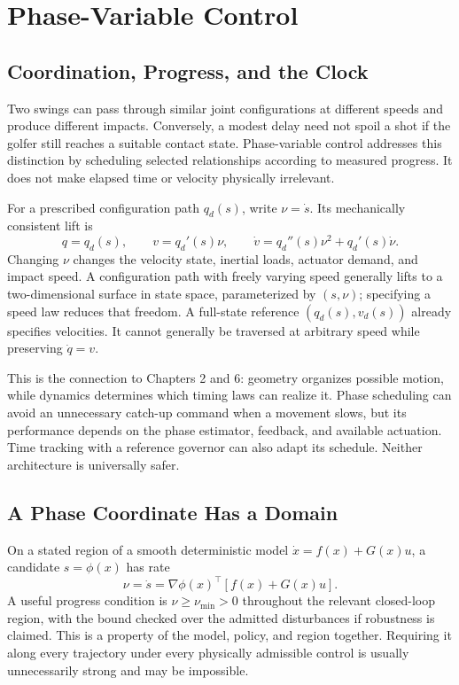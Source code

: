 \chapter{Phase-Variable Control}
\label{ch:phase_variable_control}

\section{Coordination, Progress, and the Clock}

Two swings can pass through similar joint configurations at different speeds and produce different impacts. Conversely, a modest delay need not spoil a shot if the golfer still reaches a suitable contact state. Phase-variable control addresses this distinction by scheduling selected relationships according to measured progress. It does not make elapsed time or velocity physically irrelevant.

For a prescribed configuration path $q_d(s)$, write $\nu=\dot s$. Its mechanically consistent lift is
\begin{equation}
q=q_d(s),\qquad v=q_d'(s)\nu,\qquad
\dot v=q_d''(s)\nu^2+q_d'(s)\dot\nu .
\end{equation}
Changing $\nu$ changes the velocity state, inertial loads, actuator demand, and impact speed. A configuration path with freely varying speed generally lifts to a two-dimensional surface in state space, parameterized by $(s,\nu)$; specifying a speed law reduces that freedom. A full-state reference $(q_d(s),v_d(s))$ already specifies velocities. It cannot generally be traversed at arbitrary speed while preserving $\dot q=v$.

This is the connection to Chapters 2 and 6: geometry organizes possible motion, while dynamics determines which timing laws can realize it. Phase scheduling can avoid an unnecessary catch-up command when a movement slows, but its performance depends on the phase estimator, feedback, and available actuation. Time tracking with a reference governor can also adapt its schedule. Neither architecture is universally safer.

\section{A Phase Coordinate Has a Domain}

On a stated region of a smooth deterministic model $\dot x=f(x)+G(x)u$, a candidate $s=\phi(x)$ has rate
\begin{equation}
\nu=\dot s=\nabla\phi(x)^\top[f(x)+G(x)u].
\end{equation}
A useful progress condition is $\nu\geq\nu_{\min}>0$ throughout the relevant closed-loop region, with the bound checked over the admitted disturbances if robustness is claimed. This is a property of the model, policy, and region together. Requiring it along every trajectory under every physically admissible control is usually unnecessarily strong and may be impossible.

